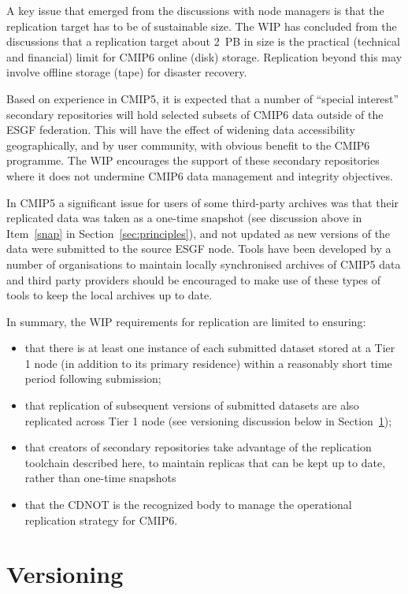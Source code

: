 \documentclass[gmd,manuscript]{copernicus}
\newcommand{\secref}[1] {\mbox{Section  \ref{sec:#1}}}
\begin{document}
A key issue that emerged from the discussions with node managers is
that the replication target has to be of sustainable size. The WIP has
concluded from the discussions that a replication target about 2~PB in
size is the practical (technical and financial) limit for CMIP6 online
(disk) storage. Replication beyond this may involve offline storage
(tape) for disaster recovery.

Based on experience in CMIP5, it is expected that a number of
``special interest'' secondary repositories will hold selected subsets
of CMIP6 data outside of the ESGF federation. This will have the
effect of widening data accessibility geographically, and by user
community, with obvious benefit to the CMIP6 programme. The WIP
encourages the support of these secondary repositories where it
does not undermine CMIP6 data management and integrity objectives.

In CMIP5 a significant issue for users of some third-party archives
was that their replicated data was taken as a one-time snapshot (see
discussion above in Item~\ref{snap} in \secref{principles}), and not
updated as new versions of the data were submitted to the source ESGF
node. Tools have been developed by a number of organisations to
maintain locally synchronised archives of CMIP5 data and third party
providers should be encouraged to make use of these types of tools to
keep the local archives up to date.

In summary, the WIP requirements for replication are limited to
ensuring:

\begin{itemize}
\item that there is at least one instance of each submitted dataset
  stored at a Tier 1 node (in addition to its primary residence)
  within a reasonably short time period following submission;
\item that replication of subsequent versions of submitted datasets
  are also replicated across Tier 1 node (see versioning discussion
  below in \secref{version});
\item that creators of secondary repositories take advantage of the
  replication toolchain described here, to maintain replicas that can
  be kept up to date, rather than one-time snapshots
\item that the CDNOT is the recognized body to manage the operational
  replication strategy for CMIP6.
\end{itemize}

\section{Versioning}
\label{sec:version}
\end{document}
